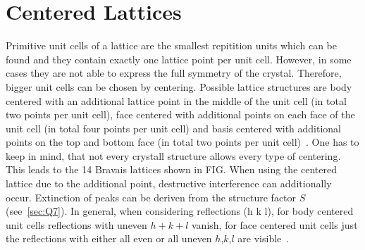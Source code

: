  
\section{Centered Lattices}\label{sec:Q6}
Primitive unit cells of a lattice are the smallest repitition units which can be found and they contain exactly one lattice point per unit cell. However, in some cases they are not able to express the full symmetry of the crystal. Therefore, bigger unit cells can be chosen by centering. Possible lattice structures are body centered with an additional lattice point in the middle of the unit cell (in total two points per unit cell), face centered with additional points on each face of the unit cell (in total four points per unit cell) and basis centered with additional points on the top and bottom face (in total two points per unit cell)~\cite{Schwarzenbach.2001}. One has to keep in mind, that not every crystall structure allows every type of centering. This leads to the 14 Bravais lattices shown in FIG. When using the centered lattice due to the additional point, destructive interference can additionally occur. Extinction of peaks can be deriven from the structure factor $S$ (see~\ref{sec:Q7}). In general, when considering reflections (h k l), for body centered unit cells reflections with uneven $h+k+l$ vanish, for face centered unit cells just the reflections with either all even or all uneven $h$,$k$,$l$ are visible~\cite{Demtroeder.2016}.
